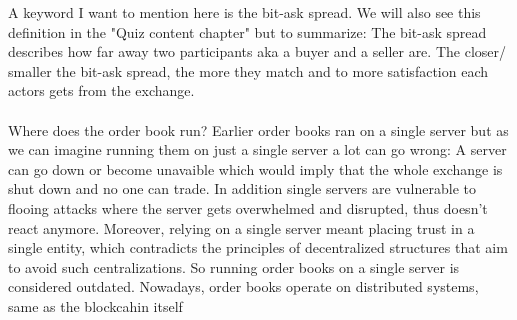 \documentclass{article}
\begin{document}
A keyword I want to mention here is the bit-ask spread. We will also see this definition in the "Quiz content chapter" but to summarize: The bit-ask spread describes how far away two participants aka a buyer and a seller are. The closer/ smaller the bit-ask spread, the more they match and to more satisfaction each actors gets from the exchange.\\
\\
Where does the order book run? Earlier order books ran on a single server but as we can imagine running them on just a single server a lot can go wrong: A server can go down or become unavaible which would imply that the whole exchange is shut down and no one can trade. In addition single servers are vulnerable to flooing attacks where the server gets overwhelmed and disrupted, thus doesn't react anymore. Moreover, relying on a single server meant placing trust in a single entity, which contradicts the principles of decentralized structures that aim to avoid such centralizations. So running order books on a single server is considered outdated. Nowadays, order books operate on distributed systems, same as the blockcahin itself
\end{document}
